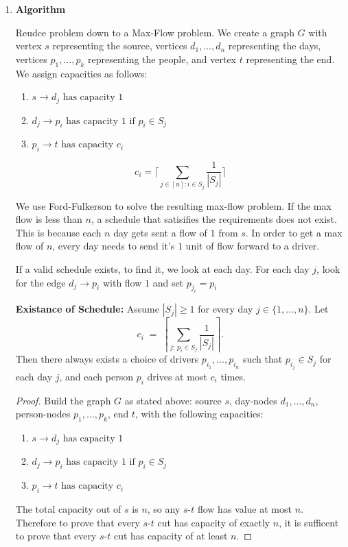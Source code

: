 \documentclass[12pt]{article}
\begin{document}
\begin{enumerate}
\item[(a)]

\textbf{Algorithm}

Reudce problem down to a Max-Flow problem. We create a graph $G$ with vertex $s$ representing the source, vertices $d_1,\dots,d_n$ representing the days, vertices
$p_1,\dots,p_k$ representing the people, and vertex $t$ representing the end. We assign capacities as follows:
\begin{enumerate}
  \item $s\to d_j \text{ has capacity }1$
  \item $d_j\to p_i \text{ has capacity }1 \text{ if } p_i\in S_j$
  \item $p_i\to t \text{ has capacity }c_i$
\end{enumerate}

\[c_i = \lceil\sum_{j \in [n]:i \in S_j}{\frac{1}{|S_j|}}\rceil\]

We use Ford-Fulkerson to solve the resulting max-flow problem. If the max flow is less than $n$, a schedule that satisifies the requirements does not exist. This is because each $n$ day gets sent a flow of $1$ from $s$. In order to get a max flow of $n$, every day needs to send it's $1$ unit of flow forward to a driver. 

If a valid schedule exists, to find it, we look at each day. For each day $j$, look for the edge $d_j \rightarrow p_i$ with flow $1$ and set $p_{j_i} = p_i$

\textbf{Existance of Schedule:} Assume $|S_j|\ge 1$ for every day $j\in\{1,\dots,n\}$.  
Let
\[
c_i \;=\;\left\lceil \sum_{j:\, p_i\in S_j}\frac{1}{|S_j|}\right\rceil .
\]
Then there always exists a choice of drivers $p_{i_1},\dots,p_{i_n}$ such that $p_{i_j}\in S_j$ for each day $j$, and each person $p_i$ drives at most $c_i$ times.

\begin{proof}
Build the graph $G$ as stated above: source $s$, day-nodes $d_1,\dots,d_n$, person-nodes
$p_1,\dots,p_k$, end $t$, with the following capacities:
\begin{enumerate}
  \item $s\to d_j \text{ has capacity }1$
  \item $d_j\to p_i \text{ has capacity }1 \text{ if } p_i\in S_j$
  \item $p_i\to t \text{ has capacity }c_i$
\end{enumerate}

The total capacity out of $s$ is $n$, so any $s$-$t$ flow has value at most $n$. Therefore to prove that every $s$-$t$ cut has capacity of exactly $n$, it is sufficent to prove that every $s$-$t$ cut has capacity of at least $n$. 


\end{proof}
\end{enumerate}
\end{document}
